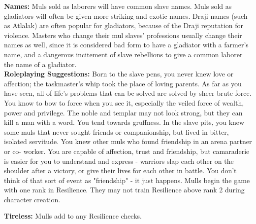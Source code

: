 {\textbf{Names:} Muls sold as laborers will have common slave
names. Muls sold as gladiators will often be given more
striking and exotic names. Draji names (such as Atlalak)
are often popular for gladiators, because of the Draji
reputation for violence. Masters who change their mul
slaves' professions usually change their names as well,
since it is considered bad form to have a gladiator with a
farmer's name, and a dangerous incitement of slave
rebellions to give a common laborer the name of a
gladiator.\\

\textbf{Roleplaying Suggestions:}
Born to the slave pens, you never knew love or
affection; the taskmaster's whip took the place of loving
parents. As far as you have seen, all of life's problems that
can be solved are solved by sheer brute force. You know
to bow to force when you see it, especially the veiled force
of wealth, power and privilege. The noble and templar
may not look strong, but they can kill a man with a word.
You tend towards gruffness. In the slave pits, you knew
some muls that never sought friends or companionship,
but lived in bitter, isolated servitude. You knew other
muls who found friendship in an arena partner or co-
worker. You are capable of affection, trust and friendship,
but camaraderie is easier for you to understand and
express - warriors slap each other on the shoulder after a
victory, or give their lives for each other in battle. You
don't think of that sort of event as "friendship" - it just
happens.
}
{Mulls begin the game with one rank in Resilience. They may not train Resilience above rank 2 during character creation. }
{\item \textbf{Tireless:} Mulls add \boost to any Resilience checks.}
{}
{}
{}
{}
{}
